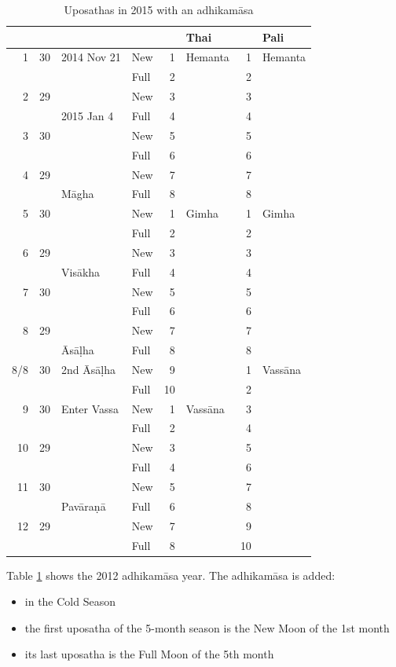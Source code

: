 \documentclass[11pt,oneside]{memoir-article}
\begin{document}
\begin{table}[p]
\caption{\label{tbl-uposathas-2015} Uposathas in 2015 with an adhikamāsa}
\centering
\begin{tabular}{rrll|rl|rl}
 &  &  &  &  & Thai &  & Pali\\
\hline
1 & 30 & 2014 Nov 21 & New & 1 & Hemanta & 1 & Hemanta\\
 &  &  & Full & 2 &  & 2 & \\
2 & 29 &  & New & 3 &  & 3 & \\
 &  & 2015 Jan 4 & Full & 4 &  & 4 & \\
3 & 30 &  & New & 5 &  & 5 & \\
 &  &  & Full & 6 &  & 6 & \\
4 & 29 &  & New & 7 &  & 7 & \\
 &  & Māgha & Full & 8 &  & 8 & \\
\hline
5 & 30 &  & New & 1 & Gimha & 1 & Gimha\\
 &  &  & Full & 2 &  & 2 & \\
6 & 29 &  & New & 3 &  & 3 & \\
 &  & Visākha & Full & 4 &  & 4 & \\
7 & 30 &  & New & 5 &  & 5 & \\
 &  &  & Full & 6 &  & 6 & \\
8 & 29 &  & New & 7 &  & 7 & \\
 &  & Āsāḷha & Full & 8 &  & 8 & \\
\hline
8/8 & 30 & 2nd Āsāḷha & New & 9 &  & 1 & Vassāna\\
 &  &  & Full & 10 &  & 2 & \\
\hline
9 & 30 & Enter Vassa & New & 1 & Vassāna & 3 & \\
 &  &  & Full & 2 &  & 4 & \\
10 & 29 &  & New & 3 &  & 5 & \\
 &  &  & Full & 4 &  & 6 & \\
11 & 30 &  & New & 5 &  & 7 & \\
 &  & Pavāraṇā & Full & 6 &  & 8 & \\
12 & 29 &  & New & 7 &  & 9 & \\
 &  &  & Full & 8 &  & 10 & \\
\end{tabular}
\end{table}

Table \ref{tbl-uposathas-2015} shows the 2012 adhikamāsa year. The adhikamāsa is
added:

\begin{itemize}
\item in the Cold Season
\item the first uposatha of the 5-month season is the New Moon of the 1st month
\item its last uposatha is the Full Moon of the 5th month
\end{itemize}
\end{document}
